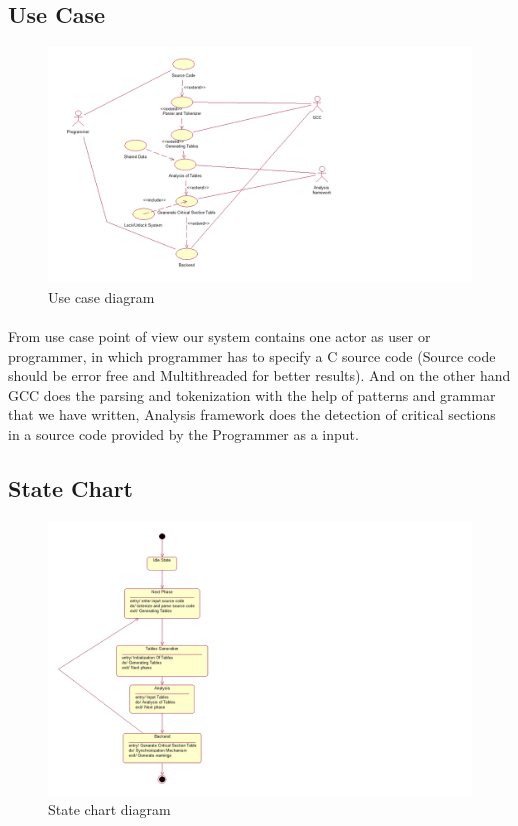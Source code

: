 \subsection{Use Case}
\begin{figure}[H]
\centering
\includegraphics[scale=0.6]{usecase.png}
\caption{Use case diagram}
\label{<<Label>>}
\end{figure}
\paragraph{}
From use case point of view our system contains one actor as user or programmer, in which programmer has to specify a C source code (Source code should be error free and Multithreaded for better results).
And on the other hand GCC does the parsing and tokenization with the help of patterns and grammar that we have written, Analysis framework does the detection of critical sections in a source code provided by the Programmer as a input.


\subsection{State Chart}
\begin{figure}[H]
\centering
\includegraphics[scale=0.7]{statechart.png}
\caption{State chart diagram}
\label{<<Label>>}
\end{figure}
